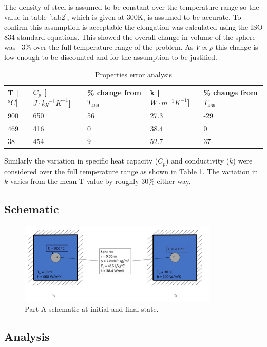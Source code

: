 \documentclass[11pt]{article}
\begin{document}
The density of steel is assumed to be constant over the temperature range so the value in table \ref{tab2}, which is given at 300K, is assumed to be accurate. To confirm this assumption is acceptable the elongation was calculated using the ISO 834 standard equations\cite{jean-marc_franssen_fire_2015}. This showed the overall change in volume of the sphere was ~3\% over the full temperature range of the problem. As $V \propto \rho$ this change is low enough to be discounted and for the assumption to be justified.

\begin{table}[h]
	\centering
	\caption{Properties error analysis}
	\begin{tabular}{lllll}
		T [$^{o}C]$ & $C_{p}$ [$J \cdot kg^{-1}K^{-1}$] & \% change from $T_{469}$ & k [$W \cdot m^{-1}K^{-1}$] & \% change from $T_{469}$ \\ \hline
		900 & 650 & 56 & 27.3 & -29 \\
		469 & 416 & 0 & 38.4 & 0 \\
		38 & 454 & 9 & 52.7 & 37
	\end{tabular}
	\label{tab3}
\end{table}

Similarly the variation in specific heat capacity ($C_p$) and conductivity ($k$) were considered over the full temperature range as shown in Table \ref{tab3}. The variation in $k$ varies from the mean T value by roughly 30\% either way.

\subsection{Schematic}
\begin{figure}[!htbp]
	\centering
	\includegraphics[width=0.85\textwidth]{part_a_fig}
	\caption{Part A schematic at initial and final state.}
	\label{fig:schem_a}
\end{figure}
\FloatBarrier
\subsection{Analysis}
\end{document}

